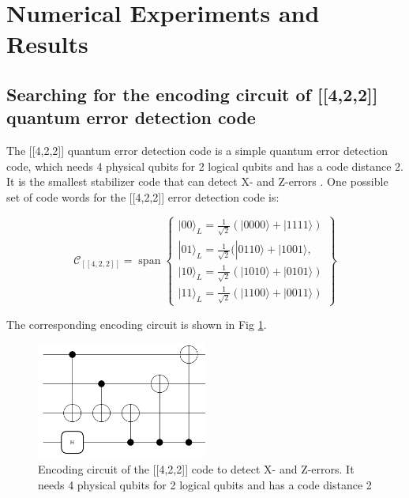 \documentclass[a4paper,onecolumn,11pt]{quantumarticle}
\begin{document}
\section{Numerical Experiments and Results}\label{experiments}
\subsection{Searching for the encoding circuit of [[4,2,2]] quantum error detection code}\label{422}

The [[4,2,2]] quantum error detection code is a simple quantum error detection code, which needs 4 physical qubits for 2 logical qubits and has a code distance 2. It is the smallest stabilizer code that can detect X- and Z-errors \cite{qec_intro_guide}. One possible set of code words for the [[4,2,2]] error detection code is:


\begin{equation}
\mathcal{C}_{[[4,2,2]]}=\operatorname{span}\left\{\begin{array}{l}
|00\rangle_{L}=\frac{1}{\sqrt{2}}(|0000\rangle+|1111\rangle) \\
|01\rangle_{L}=\frac{1}{\sqrt{2}}(|0110\rangle+|1001\rangle, \\
|10\rangle_{L}=\frac{1}{\sqrt{2}}(|1010\rangle+|0101\rangle) \\
|11\rangle_{L}=\frac{1}{\sqrt{2}}(|1100\rangle+|0011\rangle)
\end{array}\right\}
\end{equation}

The corresponding encoding circuit is shown in Fig \ref{fig:lit422}.

\begin{figure}[H]
  \centering
  \includegraphics[width=0.5\textwidth]{Figures/422_from_literature.png}
  \caption{Encoding circuit of the [[4,2,2]] code \cite{qec_intro_guide} to detect X- and Z-errors. It needs 4 physical qubits for 2 logical qubits and has a code distance 2}
  \label{fig:lit422}
\end{figure}
\end{document}
